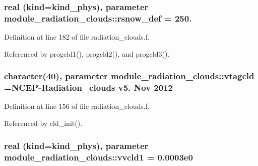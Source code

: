 \subsubsection[{\texorpdfstring{rsnow\+\_\+def}{rsnow_def}}]{\setlength{\rightskip}{0pt plus 5cm}real (kind=kind\+\_\+phys), parameter module\+\_\+radiation\+\_\+clouds\+::rsnow\+\_\+def = 250.\hspace{0.3cm}{\ttfamily [private]}}\hypertarget{namespacemodule__radiation__clouds_a2b68c4a206e17cb59597f6c4dffc7c1a}{}\label{namespacemodule__radiation__clouds_a2b68c4a206e17cb59597f6c4dffc7c1a}


Definition at line 182 of file radiation\+\_\+clouds.\+f.



Referenced by progcld1(), progcld2(), and progcld3().

\subsubsection[{\texorpdfstring{vtagcld}{vtagcld}}]{\setlength{\rightskip}{0pt plus 5cm}character(40), parameter module\+\_\+radiation\+\_\+clouds\+::vtagcld =\textquotesingle{}N\+C\+EP-\/Radiation\+\_\+clouds v5. Nov 2012 \textquotesingle{}\hspace{0.3cm}{\ttfamily [private]}}\hypertarget{namespacemodule__radiation__clouds_a54f11c2f6353f244501cf4ec3553d78b}{}\label{namespacemodule__radiation__clouds_a54f11c2f6353f244501cf4ec3553d78b}


Definition at line 156 of file radiation\+\_\+clouds.\+f.



Referenced by cld\+\_\+init().

\subsubsection[{\texorpdfstring{vvcld1}{vvcld1}}]{\setlength{\rightskip}{0pt plus 5cm}real (kind=kind\+\_\+phys), parameter module\+\_\+radiation\+\_\+clouds\+::vvcld1 = 0.\+0003e0\hspace{0.3cm}{\ttfamily [private]}}\hypertarget{namespacemodule__radiation__clouds_a6ec3c0444de53580befd4bb4d39844d3}{}\label{namespacemodule__radiation__clouds_a6ec3c0444de53580befd4bb4d39844d3}



